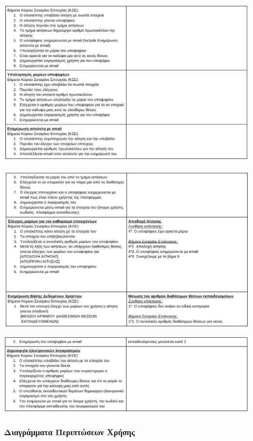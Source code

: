 \documentclass[a4paper, titlepage, twoside]{article}
\begin{document}
\begin{center}
\includegraphics[width=.9\linewidth]{2023-05-31_23-27-53_screenshot.png}
\end{center}
\begin{center}
\includegraphics[width=.9\linewidth]{2023-05-31_23-28-00_screenshot.png}
\end{center}
\begin{center}
\includegraphics[width=.9\linewidth]{2023-05-31_23-28-07_screenshot.png}
\end{center}

\subsubsection{Διαγράμματα Περιπτώσεων Χρήσης}
\label{sec:org8d781e5}
\end{document}
